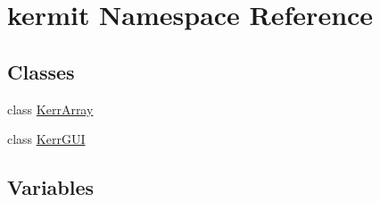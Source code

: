 \hypertarget{namespacekermit}{}\section{kermit Namespace Reference}
\label{namespacekermit}
\subsection*{Classes}
\begin{DoxyCompactItemize}
\item 
class \hyperlink{classkermit_1_1_kerr_array}{Kerr\+Array}
\item 
class \hyperlink{classkermit_1_1_kerr_g_u_i}{Kerr\+G\+UI}
\end{DoxyCompactItemize}
\subsection*{Variables}
